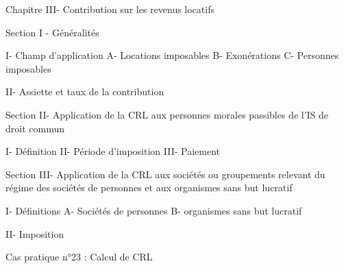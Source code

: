 Chapitre III- Contribution sur les revenus locatifs

	Section I - Généralités
		
		I- Champ d’application 
			A- Locations imposables
			B- Exonérations
			C-  Personnes imposables

		II- Assiette et taux de la contribution

	Section II- Application de la CRL aux personnes morales passibles de l'IS de droit 	commun

		I- Définition 
		II- Période d'imposition
		III- Paiement

	Section III- Application de la CRL aux sociétés ou groupements relevant du régime 	des sociétés de personnes et aux organismes sans but lucratif
		
		I- Définitions 
			A- Sociétés de personnes
			B- organismes sans but lucratif

		II- Imposition 

		Cas pratique n°23 : Calcul de CRL 
